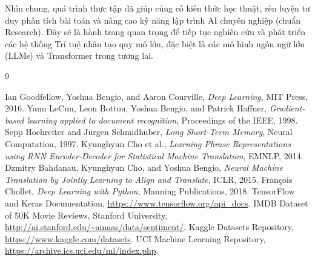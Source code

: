 \documentclass[12pt, a4paper]{article}
\begin{document}
Nhìn chung, quá trình thực tập đã giúp củng cố kiến thức học thuật, rèn luyện tư duy phân tích bài toán và nâng cao kỹ năng lập trình AI chuyên nghiệp (chuẩn Research). Đây sẽ là hành trang quan trọng để tiếp tục nghiên cứu và phát triển các hệ thống Trí tuệ nhân tạo quy mô lớn, đặc biệt là các mô hình ngôn ngữ lớn (LLMs) và Transformer trong tương lai.

\newpage
\begin{thebibliography}{9}
 Ian Goodfellow, Yoshua Bengio, and Aaron Courville, \textit{Deep Learning}, MIT Press, 2016.
 Yann LeCun, Leon Bottou, Yoshua Bengio, and Patrick Haffner, \textit{Gradient-based learning applied to document recognition}, Proceedings of the IEEE, 1998.
 Sepp Hochreiter and Jürgen Schmidhuber, \textit{Long Short-Term Memory}, Neural Computation, 1997.
 Kyunghyun Cho et al., \textit{Learning Phrase Representations using RNN Encoder-Decoder for Statistical Machine Translation}, EMNLP, 2014.
 Dzmitry Bahdanau, Kyunghyun Cho, and Yoshua Bengio, \textit{Neural Machine Translation by Jointly Learning to Align and Translate}, ICLR, 2015.
 François Chollet, \textit{Deep Learning with Python}, Manning Publications, 2018.
 TensorFlow and Keras Documentation, \url{https://www.tensorflow.org/api_docs}.
 IMDB Dataset of 50K Movie Reviews, Stanford University, \url{http://ai.stanford.edu/~amaas/data/sentiment/}.
 Kaggle Datasets Repository, \url{https://www.kaggle.com/datasets}.
 UCI Machine Learning Repository, \url{https://archive.ics.uci.edu/ml/index.php}.
\end{thebibliography}
\end{document}
